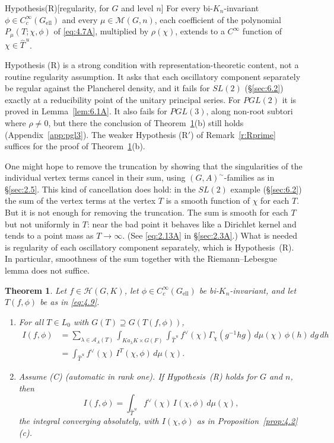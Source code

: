 \documentclass[12pt,letterpaper]{article}
\numberwithin{equation}{section}
\theoremstyle{plain}
\newtheorem{theorem}[lemma]{Theorem}
\theoremstyle{remark}
\theoremstyle{plain}
\theoremstyle{definition}
\theoremstyle{remark}
\theoremstyle{remark}
\newcommand{\cA}{\mathcal{A}}
\newcommand{\Hc}{\mathcal{H}}
\newcommand{\Thu}{\widehat{T}^{\,u}}
\newcommand{\ellr}{\mathrm{ell}}
\begin{document}
\begin{fixeddef}{Hypothesis}{(R)}[regularity, for $G$ and level $n$]\label{hyp:R}
For every bi-$K_n$-invariant $\phi\in C_c^\infty(G_{\ellr})$ and every $\mu\in\mathcal M(G,n)$, each coefficient of the polynomial $P_\mu(T;\chi,\phi)$ of \eqref{eq:4.7A}, multiplied by $\rho(\chi)$, extends to a $C^\infty$ function of $\chi\in\Thu$.
\end{fixeddef}

Hypothesis (R) is a strong condition with representation-theoretic content, not a routine regularity assumption. It asks that each oscillatory component separately be regular against the Plancherel density, and it fails for $SL(2)$ (\S\ref{sec:6.2}) exactly at a reducibility point of the unitary principal series. For $PGL(2)$ it is proved in Lemma~\ref{lem:6.1A}. It also fails for $PGL(3)$, along non-root subtori where $\rho\ne0$, but there the conclusion of Theorem~\ref{thm:4.5}(b) still holds (Appendix~\ref{app:pgl3}). The weaker Hypothesis (R$'$) of Remark~\ref{r:Rprime} suffices for the proof of Theorem~\ref{thm:4.5}(b).

\begin{rem26}\label{r:GAfam}
One might hope to remove the truncation by showing that the singularities of the individual vertex terms cancel in their sum, using $(G,A)^\sim$-families as in \S\ref{sec:2.5}. This kind of cancellation does hold: in the $SL(2)$ example (\S\ref{sec:6.2}) the sum of the vertex terms at the vertex $T$ is a smooth function of $\chi$ for each $T$. But it is not enough for removing the truncation. The sum is smooth for each $T$ but not uniformly in $T$: near the bad point it behaves like a Dirichlet kernel and tends to a point mass as $T\to\infty$. (See \eqref{eq:2.13A} in \S\ref{sec:2.3A}.) What is needed is regularity of each oscillatory component separately, which is Hypothesis~(R). In particular, smoothness of the sum together with the Riemann--Lebesgue lemma does not suffice.
\end{rem26}

\begin{theorem}\label{thm:4.5}
Let $f\in\Hc(G,K)$, let $\phi\in C_c^\infty(G_{\ellr})$ be bi-$K_n$-invariant, and let $T(f,\phi)$ be as in \eqref{eq:4.9}.
\begin{enumerate}[label=(\alph*)]
\item For all $T\in L_0$ with $G(T)\supseteq G(T(f,\phi))$,
\[
\begin{aligned}
I(f,\phi)&=\sum_{\lambda\in\cA_A(T)}\int_{Ka_\lambda K\times G(F)}\int_{\Thu}f^\vee(\chi)\Gamma_\chi(g^{-1}hg)\,d\mu(\chi)\,\phi(h)\,dg\,dh\\
&=\int_{\Thu}f^\vee(\chi)\,I^T(\chi,\phi)\,d\mu(\chi).
\end{aligned}
\]
\item Assume (C) (automatic in rank one). If Hypothesis~(R) holds for $G$ and $n$, then
\[
I(f,\phi)=\int_{\Thu}f^\vee(\chi)\,I(\chi,\phi)\,d\mu(\chi),
\]
the integral converging absolutely, with $I(\chi,\phi)$ as in Proposition~\ref{prop:4.2}(c).
\end{enumerate}
\end{theorem}
\end{document}
